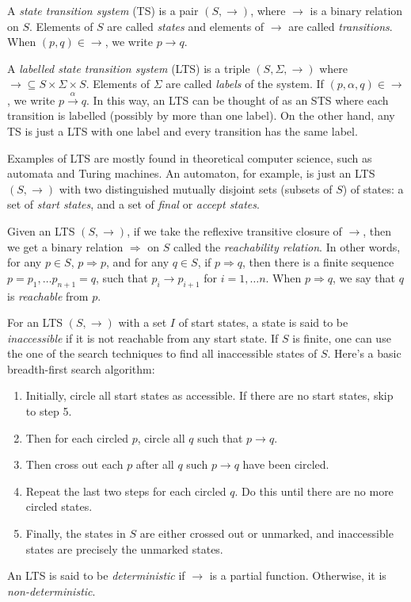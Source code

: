 \documentclass[12pt]{article}
\begin{document}
A \emph{state transition system} (TS) is a pair $(S,\rightarrow)$, where $\rightarrow$ is a binary relation on $S$.  Elements of $S$ are called \emph{states} and elements of $\rightarrow$ are called \emph{transitions}.  When $(p,q)\in \rightarrow$, we write $p\rightarrow q$.  

A \emph{labelled state transition system} (LTS) is a triple $(S,\Sigma,\rightarrow)$ where $\rightarrow \subseteq S\times \Sigma \times S$.  Elements of $\Sigma$ are called \emph{labels} of the system.  If $(p,\alpha,q)\in \rightarrow$, we write $p\stackrel{\alpha}{\rightarrow} q$.  In this way, an LTS can be thought of as an STS where each transition is labelled (possibly by more than one label).  On the other hand, any TS is just a LTS with one label and every transition has the same label.

Examples of LTS are mostly found in theoretical computer science, such as automata and Turing machines.  An automaton, for example, is just an LTS $(S,\rightarrow)$ with two distinguished mutually disjoint sets (subsets of $S$) of states: a set of \emph{start states}, and a set of \emph{final} or \emph{accept states}.

Given an LTS $(S,\rightarrow)$, if we take the reflexive transitive closure of $\rightarrow$, then we get a binary relation $\Rightarrow$ on $S$ called the \emph{reachability relation}.  In other words, for any $p\in S$, $p\Rightarrow p$, and for any $q\in S$, if $p\Rightarrow q$, then there is a finite sequence $p=p_1,\ldots p_{n+1}=q$, such that $p_i\rightarrow p_{i+1}$ for $i=1,\ldots n$.  When $p\Rightarrow q$, we say that $q$ is \emph{reachable} from $p$.

For an LTS $(S,\rightarrow)$ with a set $I$ of start states, a state is said to be \emph{inaccessible} if it is not reachable from any start state.  If $S$ is finite, one can use the one of the search techniques to find all inaccessible states of $S$.  Here's a basic breadth-first search algorithm:
\begin{enumerate}
\item Initially, circle all start states as accessible.  If there are no start states, skip to step 5.
\item Then for each circled $p$, circle all $q$ such that $p\rightarrow q$.  
\item Then cross out each $p$ after all $q$ such $p\rightarrow q$ have been circled.  
\item Repeat the last two steps for each circled $q$.  Do this until there are no more circled states.  
\item Finally, the states in $S$ are either crossed out or unmarked, and inaccessible states are precisely the unmarked states.
\end{enumerate}

An LTS is said to be \emph{deterministic} if $\rightarrow$ is a partial function.  Otherwise, it is \emph{non-deterministic}.

\end{document}
